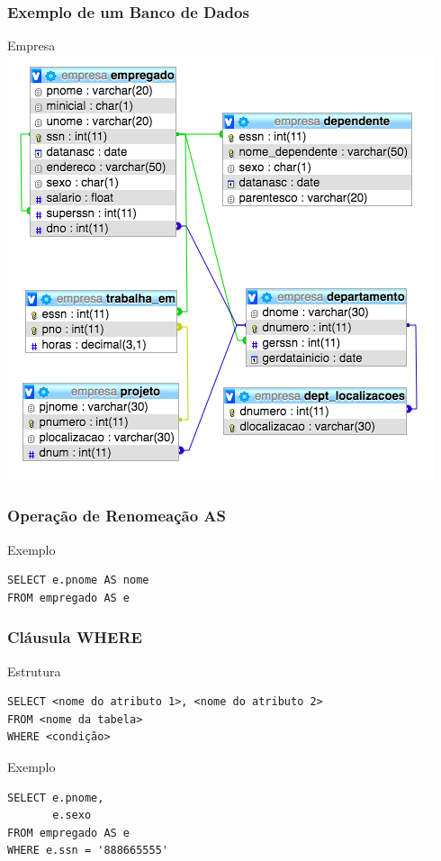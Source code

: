 \documentclass{beamer}
\begin{document}
\begin{frame}
\frametitle{Exemplo de um Banco de Dados}

\begin{exampleblock}{Empresa}
\centering
\includegraphics[scale=0.4]{empresa}
\end{exampleblock}
\end{frame}

\begin{frame}[fragile]
\frametitle{Operação de Renomeação AS}

\begin{exampleblock}{Exemplo}
	\begin{lstlisting}
SELECT e.pnome AS nome
FROM empregado AS e
	\end{lstlisting}
\end{exampleblock}
\end{frame}

\begin{frame}[fragile]
\frametitle{Cláusula WHERE}

\begin{block}{Estrutura}
	\begin{lstlisting}
SELECT <nome do atributo 1>, <nome do atributo 2>
FROM <nome da tabela>
WHERE <condição>
	\end{lstlisting}
\end{block}\vfill

\begin{exampleblock}{Exemplo}
	\begin{lstlisting}
SELECT e.pnome, 
       e.sexo
FROM empregado AS e
WHERE e.ssn = '888665555'
	\end{lstlisting}
\end{exampleblock}
\end{frame}
\end{document}
